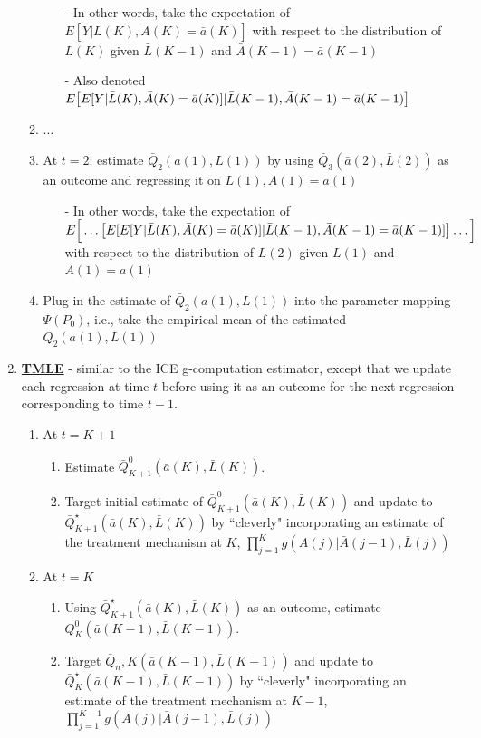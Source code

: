 \documentclass[answers]{exam}
\begin{document}
\begin{enumerate}
\begin{enumerate}
\begin{itemize}
\item[-] In other words, take the expectation of $E[Y|\bar{L}(K), \bar{A}(K) = \bar{a}(K)]$ with respect to the distribution of $L(K)$ given $\bar{L}(K-1)$ and $\bar{A}(K-1) = \bar{a}(K-1)$
\item[-] Also denoted $E\big{[}E[Y|\bar{L}(K), \bar{A}(K) = \bar{a}(K)] | \bar{L}(K-1), \bar{A}(K-1) = \bar{a}(K-1)\big{]}$
\end{itemize}
\item $\ldots$
\item At $t = 2$: estimate $\bar{Q}_2(a(1), L(1))$ by using $\bar{Q}_{3}(\bar{a}(2), \bar{L}(2))$ as an outcome and regressing it on $L(1), A(1) = a(1)$
\begin{itemize}
\item[-] In other words, take the expectation of $E\Big{[}\ldots\big{[}E[E[Y|\bar{L}(K), \bar{A}(K) = \bar{a}(K)] | \bar{L}(K-1), \bar{A}(K-1) = \bar{a}(K-1)]\big{]}\ldots\Big{]}$ with respect to the distribution of $L(2)$ given $L(1)$ and $A(1) = a(1)$ 
\end{itemize}
\item Plug in the estimate of $\bar{Q}_2(a(1), L(1))$ into the parameter mapping $\Psi(P_0)$, i.e., take the empirical mean of the estimated $\bar{Q}_2(a(1), L(1))$
\end{enumerate}
\item \textbf{\underline{TMLE}} - similar to the ICE g-computation estimator, except that we update each regression at time $t$ before using it as an outcome for the next regression corresponding to time $t-1$.
\begin{enumerate}
\item At $t = K+1$
\begin{enumerate}
\item Estimate $\bar{Q}^0_{K+1}(\bar{a}(K), \bar{L}(K))$.
\item Target initial estimate of $\bar{Q}^0_{K+1}(\bar{a}(K), \bar{L}(K))$ and update to $\bar{Q}^\star_{K+1}(\bar{a}(K), \bar{L}(K))$  by ``cleverly" incorporating an estimate of the treatment mechanism at $K$, $\prod_{j=1}^Kg(A(j)|\bar{A}(j-1),\bar{L}(j))$
\end{enumerate}
\item At $t = K$
\begin{enumerate}
\item Using $\bar{Q}^\star_{K+1}(\bar{a}(K), \bar{L}(K))$ as an outcome, estimate $Q^0_K(\bar{a}(K-1), \bar{L}(K-1))$. 
\item Target $\bar{Q}_n,K(\bar{a}(K-1), \bar{L}(K-1))$ and update to $\bar{Q}^\star_K(\bar{a}(K-1), \bar{L}(K-1))$ by ``cleverly" incorporating an estimate of the treatment mechanism at $K-1$, $\prod_{j=1}^{K-1}g(A(j)|\bar{A}(j-1),\bar{L}(j))$

\end{enumerate}
\end{enumerate}
\end{enumerate}
\end{document}
